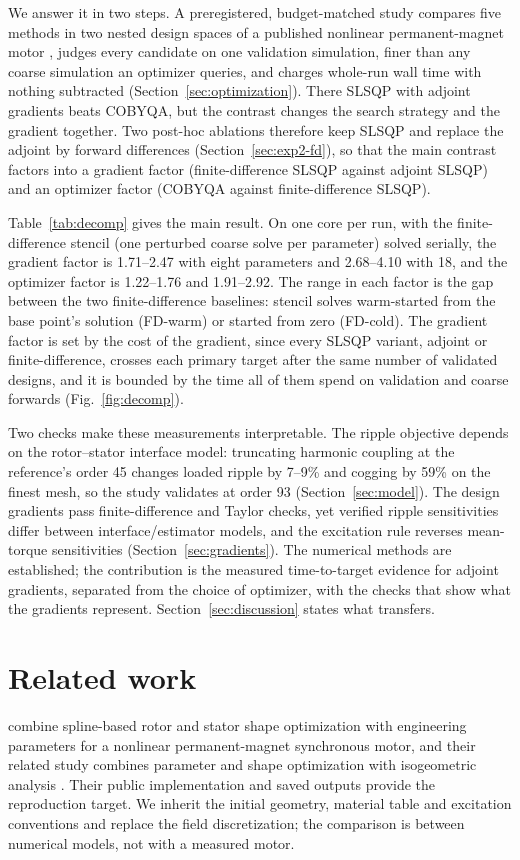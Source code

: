 \documentclass{anvil-paper}
\begin{document}
We answer it in two steps. A preregistered, budget-matched study compares
five methods in two nested design spaces of a published nonlinear
permanent-magnet motor \citep{wiesheu2024spline}, judges every candidate
on one validation simulation, finer than any coarse simulation an optimizer
queries, and charges
whole-run wall time with nothing subtracted (Section~\ref{sec:optimization}).
There SLSQP with adjoint gradients beats COBYQA, but the contrast changes
the search strategy and the gradient together. Two post-hoc ablations
therefore keep SLSQP and replace the adjoint by forward differences
(Section~\ref{sec:exp2-fd}), so that the main contrast factors into a
gradient factor (finite-difference SLSQP against adjoint SLSQP) and an
optimizer factor (COBYQA against finite-difference SLSQP).

Table~\ref{tab:decomp} gives the main result. On one core per run, with
the finite-difference stencil (one perturbed coarse solve per parameter)
solved serially, the gradient factor is 1.71--2.47 with eight parameters
and 2.68--4.10 with 18, and the optimizer factor is 1.22--1.76 and
1.91--2.92. The range in each factor is the gap between the two
finite-difference baselines: stencil solves warm-started from the base
point's solution (FD-warm) or started from zero (FD-cold). The gradient
factor is set by the cost of the gradient, since every SLSQP variant,
adjoint or finite-difference, crosses each primary target after the same
number of validated designs, and it is bounded by the time all of them
spend on validation and coarse forwards (Fig.~\ref{fig:decomp}).

Two checks make these measurements interpretable. The ripple objective
depends on the rotor--stator interface model: truncating harmonic coupling
at the reference's order 45 changes loaded ripple by 7--9\% and cogging by
59\% on the finest mesh, so the study validates at order 93
(Section~\ref{sec:model}). The design gradients pass finite-difference and
Taylor checks, yet verified ripple sensitivities differ between
interface/estimator models, and the excitation rule reverses mean-torque
sensitivities (Section~\ref{sec:gradients}). The numerical methods are
established; the contribution is the measured time-to-target evidence for
adjoint gradients, separated from the choice of optimizer, with the checks
that show what the gradients represent. Section~\ref{sec:discussion} states
what transfers.

\section{Related work}
\citet{wiesheu2024spline} combine spline-based rotor and stator shape
optimization with engineering parameters for a nonlinear permanent-magnet
synchronous motor, and their related study combines parameter and shape
optimization with isogeometric analysis \citep{wiesheu2025combined}. Their
public implementation and saved outputs provide the reproduction target.
We inherit the initial geometry, material table and excitation
conventions and replace the field discretization; the comparison is
between numerical models, not with a measured motor.
\end{document}
